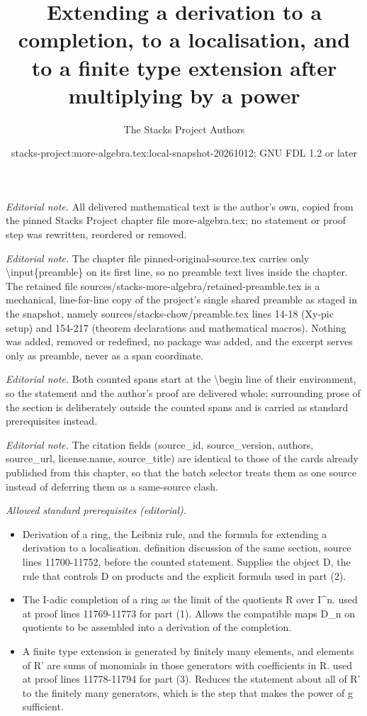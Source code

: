 \documentclass[10pt,a4paper]{amsart}
\title{Extending a derivation to a completion, to a localisation, and to a finite type extension after multiplying by a power}
\author{The Stacks Project Authors}
\date{stacks-project:more-algebra.tex:local-snapshot-20261012; GNU FDL 1.2 or later}
\theoremstyle{plain}
\theoremstyle{definition}
\theoremstyle{remark}
\numberwithin{equation}{subsection}
\begin{document}
\maketitle
\setcounter{subsection}{1}
\noindent\textit{Editorial note.} All delivered mathematical text is the author's own, copied from the pinned Stacks Project chapter file more-algebra.tex; no statement or proof step was rewritten, reordered or removed.\par\medskip
\noindent\textit{Editorial note.} The chapter file pinned-original-source.tex carries only \textbackslash{}input\{preamble\} on its first line, so no preamble text lives inside the chapter. The retained file sources/stacks-more-algebra/retained-preamble.tex is a mechanical, line-for-line copy of the project's single shared preamble as staged in the snapshot, namely sources/stacks-chow/preamble.tex lines 14-18 (Xy-pic setup) and 154-217 (theorem declarations and mathematical macros). Nothing was added, removed or redefined, no package was added, and the excerpt serves only as preamble, never as a span coordinate.\par\medskip
\noindent\textit{Editorial note.} Both counted spans start at the \textbackslash{}begin line of their environment, so the statement and the author's proof are delivered whole; surrounding prose of the section is deliberately outside the counted spans and is carried as standard prerequisites instead.\par\medskip
\noindent\textit{Editorial note.} The citation fields (source\_id, source\_version, authors, source\_url, license.name, source\_title) are identical to those of the cards already published from this chapter, so that the batch selector treats them as one source instead of deferring them as a same-source clash.\par\medskip
\noindent\textit{Allowed standard prerequisites (editorial).}\begin{itemize}
\item Derivation of a ring, the Leibniz rule, and the formula for extending a derivation to a localisation. definition discussion of the same section, source lines 11700-11752, before the counted statement. Supplies the object D, the rule that controls D on products and the explicit formula used in part (2).
\item The I-adic completion of a ring as the limit of the quotients R over I\textasciicircum{}n. used at proof lines 11769-11773 for part (1). Allows the compatible maps D\_n on quotients to be assembled into a derivation of the completion.
\item A finite type extension is generated by finitely many elements, and elements of R' are sums of monomials in those generators with coefficients in R. used at proof lines 11778-11794 for part (3). Reduces the statement about all of R' to the finitely many generators, which is the step that makes the power of g sufficient.
\end{itemize}\medskip
\end{document}
